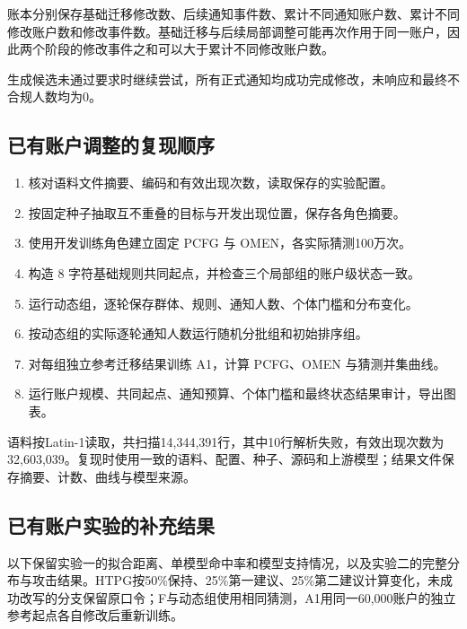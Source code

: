 \documentclass{crypto_report}
\begin{document}
账本分别保存基础迁移修改数、后续通知事件数、累计不同通知账户数、累计不同修改账户数和修改事件数。基础迁移与后续局部调整可能再次作用于同一账户，因此两个阶段的修改事件之和可以大于累计不同修改账户数。

生成候选未通过要求时继续尝试，所有正式通知均成功完成修改，未响应和最终不合规人数均为0。

\subsection{已有账户调整的复现顺序}\label{b.3-ux590dux73b0ux987aux5e8f}

\begin{enumerate}
\def\labelenumi{\arabic{enumi}.}
\item
  核对语料文件摘要、编码和有效出现次数，读取保存的实验配置。
\item
  按固定种子抽取互不重叠的目标与开发出现位置，保存各角色摘要。
\item
  使用开发训练角色建立固定 PCFG 与 OMEN，各实际猜测100万次。
\item
  构造 8 字符基础规则共同起点，并检查三个局部组的账户级状态一致。
\item
  运行动态组，逐轮保存群体、规则、通知人数、个体门槛和分布变化。
\item
  按动态组的实际逐轮通知人数运行随机分批组和初始排序组。
\item
  对每组独立参考迁移结果训练 A1，计算 PCFG、OMEN 与猜测并集曲线。
\item
  运行账户规模、共同起点、通知预算、个体门槛和最终状态结果审计，导出图表。
\end{enumerate}

语料按Latin-1读取，共扫描14,344,391行，其中10行解析失败，有效出现次数为32,603,039。复现时使用一致的语料、配置、种子、源码和上游模型；结果文件保存摘要、计数、曲线与模型来源。

\subsection{已有账户实验的补充结果}\label{app:existing-additional-results}

以下保留实验一的拟合距离、单模型命中率和模型支持情况，以及实验二的完整分布与攻击结果。HTPG按50\%保持、25\%第一建议、25\%第二建议计算变化，未成功改写的分支保留原口令；F与动态组使用相同猜测，A1用同一60,000账户的独立参考起点各自修改后重新训练。
\end{document}
